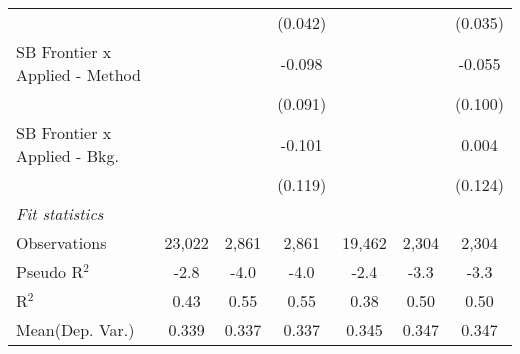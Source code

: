 \begin{tabular}{lcccccc}
                                  &               &               & (0.042)       &               &         & (0.035)\\   
   SB Frontier x Applied - Method &               &               & -0.098        &               &         & -0.055\\   
                                  &               &               & (0.091)       &               &         & (0.100)\\   
   SB Frontier x Applied - Bkg.   &               &               & -0.101        &               &         & 0.004\\   
                                  &               &               & (0.119)       &               &         & (0.124)\\   
   \midrule
   \emph{Fit statistics}\\
   Observations                   & 23,022        & 2,861         & 2,861         & 19,462        & 2,304   & 2,304\\  
   Pseudo R$^2$                   & -2.8          & -4.0          & -4.0          & -2.4          & -3.3    & -3.3\\  
   R$^2$                          & 0.43          & 0.55          & 0.55          & 0.38          & 0.50    & 0.50\\  
Mean(Dep. Var.) & 0.339 & 0.337 & 0.337 & 0.345 & 0.347 & 0.347 \\
   

\end{tabular}
